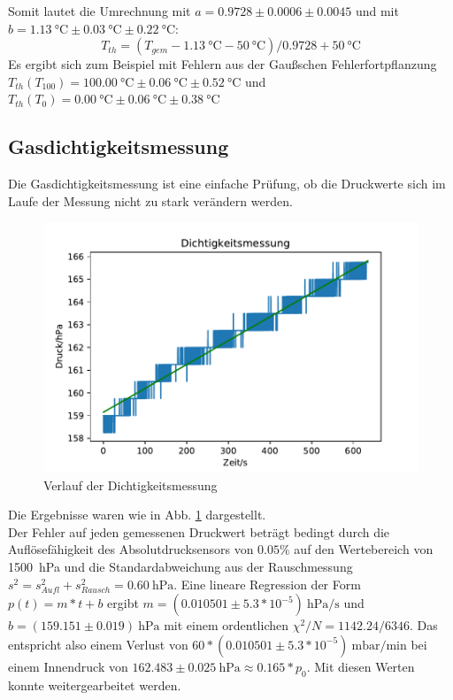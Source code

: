 \documentclass[]{article}
\begin{document}
Somit lautet die Umrechnung
mit $a = 0.9728 \pm 0.0006 \pm 0.0045$
und mit $b = \SI{1.13}{\celsius} \pm \SI{0.03}{\celsius} \pm \SI{0.22}{\celsius}$:
\begin{equation}
T_{th} = (T_{gem}-\SI{1.13}{\celsius}-\SI{50}{\celsius})/0.9728 + \SI{50}{\celsius}
\label{Kalibrierung}
\end{equation}
Es ergibt sich zum Beispiel mit Fehlern aus der Gaußschen Fehlerfortpflanzung $T_{th}(T_{100}) = \SI{100.00}{\celsius} \pm  \SI{0.06}{\celsius} \pm \SI{0.52}{\celsius}$
und $T_{th}(T_0) = \SI{0.00}{\celsius} \pm \SI{0.06}{\celsius} \pm \SI{0.38}{\celsius}$
\\
\subsection{Gasdichtigkeitsmessung}
Die Gasdichtigkeitsmessung ist eine einfache Prüfung, ob die Druckwerte sich im Laufe der Messung nicht zu stark verändern werden.\\
\begin{figure}
	\begin{center}
		\includegraphics[scale=0.9]{Images/Kalib_Dichtigkeitsmessung.pdf}
		\caption{Verlauf der Dichtigkeitsmessung}
		\label{GD_data}
	\end{center}
\end{figure}
Die Ergebnisse waren wie in Abb. \ref{GD_data} dargestellt. \\
Der Fehler auf jeden gemessenen Druckwert beträgt bedingt durch die Auflösefähigkeit des Absolutdrucksensors von $0.05\%$ auf den Wertebereich von \SI{1500}{\hecto \pascal} und die
 Standardabweichung aus der Rauschmessung $s^{2} = s^{2}_{Aufl}+s^{2}_{Rausch} = \SI{0.60}{\hecto \pascal}$. 
Eine lineare Regression der Form $p(t)=m*t+b$ ergibt $m = (0.010501 \pm 5.3*10^{-5})\SI{}{\hecto \pascal/ \second}$ und $b = (159.151 \pm 0.019)\SI{}{\hecto \pascal}$ mit einem ordentlichen $\chi ^{2}/N=1142.24 / 6346$. Das entspricht also einem Verlust von $60*(0.010501 \pm 5.3*10^{-5})\SI{}{\milli \bar / \minute}$ bei einem Innendruck von $162.483 \pm 0.025 \SI{}{\hecto \pascal} \approx 0.165*p_0$. Mit diesen Werten konnte weitergearbeitet werden.
\end{document}
